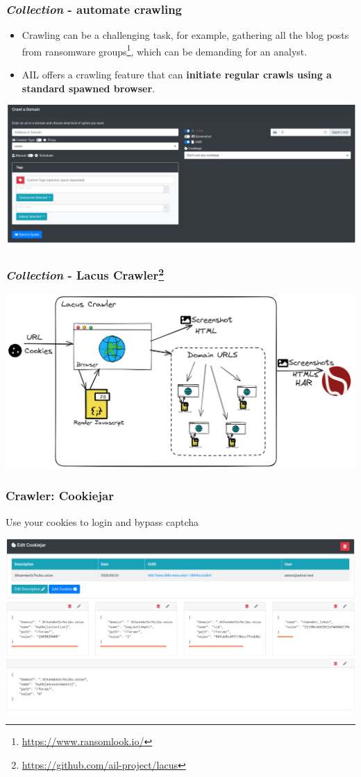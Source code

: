 \documentclass[10pt,aspectratio=169, colorlinks=true, linkcolor=circlBlue]{beamer}
\begin{document}
\begin{frame}
    \frametitle{{\it Collection} - automate crawling}

\begin{itemize}
    \item Crawling can be a challenging task, for example, gathering all the blog posts from ransomware groups\footnote{\url{https://www.ransomlook.io/}}, which can be demanding for an analyst.
    \item AIL offers a crawling feature that can {\bf initiate regular crawls using a standard spawned browser}.
\end{itemize}
    \begin{center}
        \includegraphics[scale=0.17]{images/ail-crawling.png}
    \end{center}
\end{frame}

\begin{frame}
    \frametitle{{\it Collection} - Lacus Crawler\footnote{\url{https://github.com/ail-project/lacus}}}
        	\includegraphics[scale=0.27]{images/ail-lacus.png}
\end{frame}


\begin{frame}
    \frametitle{Crawler: Cookiejar}
    Use your cookies to login and bypass captcha
    \centerline{
        \includegraphics[scale=0.23]{screenshot/crawler-cookiejar-edit.png}
    }
\end{frame}
\end{document}
